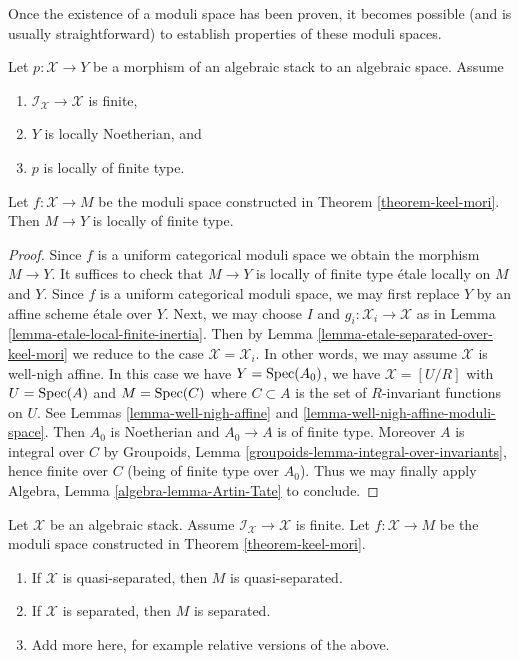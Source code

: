 \noindent
Once the existence of a moduli space has been proven,
it becomes possible (and is usually straightforward) to
establish properties of these moduli spaces.

\begin{lemma}
\label{lemma-keel-mori-finite-type}
Let $p : \mathcal{X} \to Y$ be a morphism of an algebraic stack to an
algebraic space. Assume
\begin{enumerate}
\item $\mathcal{I}_\mathcal{X} \to \mathcal{X}$ is finite,
\item $Y$ is locally Noetherian, and
\item $p$ is locally of finite type.
\end{enumerate}
Let $f : \mathcal{X} \to M$ be the moduli space constructed in
Theorem \ref{theorem-keel-mori}.
Then $M \to Y$ is locally of finite type.
\end{lemma}

\begin{proof}
Since $f$ is a uniform categorical moduli space we obtain the
morphism $M \to Y$. It suffices to check that $M \to Y$
is locally of finite type \'etale locally on $M$ and $Y$.
Since $f$ is a uniform categorical moduli space, we
may first replace $Y$ by an affine scheme \'etale over $Y$.
Next, we may choose $I$ and $g_i : \mathcal{X}_i \to \mathcal{X}$
as in Lemma \ref{lemma-etale-local-finite-inertia}.
Then by Lemma \ref{lemma-etale-separated-over-keel-mori}
we reduce to the case $\mathcal{X} = \mathcal{X}_i$.
In other words, we may assume $\mathcal{X}$ is well-nigh affine.
In this case we have $Y = \mathop{\mathrm{Spec}}(A_0)$, we have
$\mathcal{X} = [U/R]$ with $U = \mathop{\mathrm{Spec}}(A)$ and
$M = \mathop{\mathrm{Spec}}(C)$ where $C \subset A$ is the set of $R$-invariant
functions on $U$. See
Lemmas \ref{lemma-well-nigh-affine} and
\ref{lemma-well-nigh-affine-moduli-space}.
Then $A_0$ is Noetherian and $A_0 \to A$ is of finite type.
Moreover $A$ is integral over $C$ by
Groupoids, Lemma \ref{groupoids-lemma-integral-over-invariants},
hence finite over $C$
(being of finite type over $A_0$).
Thus we may finally apply
Algebra, Lemma \ref{algebra-lemma-Artin-Tate}
to conclude.
\end{proof}

\begin{lemma}
\label{lemma-keel-mori-diagonal}
Let $\mathcal{X}$ be an algebraic stack. Assume
$\mathcal{I}_\mathcal{X} \to \mathcal{X}$ is finite.
Let $f : \mathcal{X} \to M$ be the moduli space constructed in
Theorem \ref{theorem-keel-mori}.
\begin{enumerate}
\item If $\mathcal{X}$ is quasi-separated, then $M$ is quasi-separated.
\item If $\mathcal{X}$ is separated, then $M$ is separated.
\item Add more here, for example relative versions of the above.
\end{enumerate}
\end{lemma}

